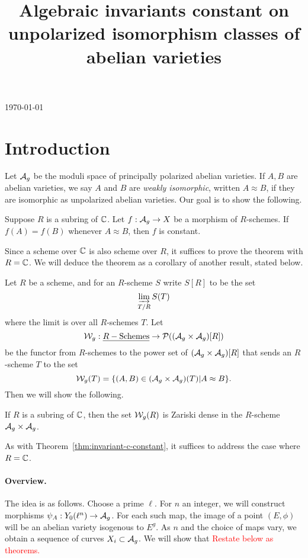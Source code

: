 \documentclass{amsart}
\title[Invariants constant on unpolarized isomorphism classes]{Algebraic invariants constant on unpolarized isomorphism classes of abelian varieties}
\begin{document}
\today
\tableofcontents
\maketitle

\section{Introduction}
\label{sec:introduction}

Let $\mathcal{A}_g$ be the moduli space of principally polarized abelian varieties. If $A, B$ are abelian varieties, we say $A$ and $B$ are \emph{weakly isomorphic}, written $A \approx B$, if they are isomorphic as unpolarized abelian varieties. Our goal is to show the following.
\begin{theorem}\label{thm:invariant-c-constant}
  Suppose $R$ is a subring of $\mathbb{C}$. Let $f: \mathcal{A}_g \to X$ be a morphism of $R$-schemes. If $f(A) = f(B)$ whenever $A \approx B$, then $f$ is constant.
\end{theorem}
Since a scheme over $\mathbb{C}$ is also scheme over $R$, it suffices to prove the theorem with $R = \mathbb{C}$. We will deduce the theorem as a corollary of another result, stated below.

Let $R$ be a scheme, and for an $R$-scheme $S$ write $S[R]$ to be the set
\[
  \varinjlim_{T/R} S(T)
\]
where the limit is over all $R$-schemes $T$. Let
\[
  \mathcal{W}_g: \underline{R-\textrm{Schemes}} \to \mathcal{P}((\mathcal{A}_g \times \mathcal{A}_g)[R])
\]
be the functor from $R$-schemes to the power set of $(\mathcal{A}_g \times \mathcal{A}_g)[R]$ that sends an $R$-scheme $T$ to the set
\[
  \mathcal{W}_g(T) = \{(A,B) \in (\mathcal{A}_g \times \mathcal{A}_g)(T) | A \approx B\}.
\]
Then we will show the following.
\begin{theorem}\label{thm:sg-c-dense}
  If $R$ is a subring of $\mathbb{C}$, then the set $\mathcal{W}_g(R)$ is Zariski dense in the $R$-scheme $\mathcal{A}_g \times \mathcal{A}_g$.
\end{theorem}
As with Theorem~\ref{thm:invariant-c-constant}, it suffices to address the case where $R = \mathbb{C}$.

\paragraph{Overview.}

The idea is as follows. Choose a prime $\ell$. For $n$ an integer, we will construct morphisms $\psi_A: Y_0(\ell^n) \to \mathcal{A}_g$. For each such map, the image of a point $(E, \phi)$ will be an abelian variety isogenous to $E^g$. As $n$ and the choice of maps vary, we obtain a sequence of curves $X_i \subset \mathcal{A}_g$. We will show that \textcolor{red}{Restate below as theorems.}
\end{document}
